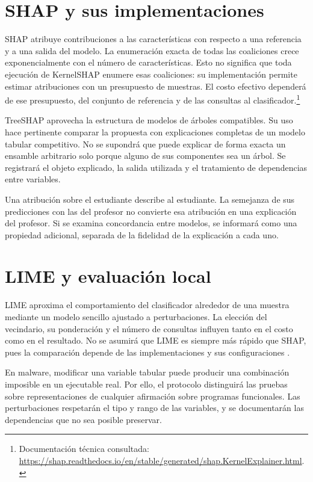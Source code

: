 \section{SHAP y sus implementaciones}
SHAP atribuye contribuciones a las características con respecto a una referencia y a una salida del modelo. La enumeración exacta de todas las coaliciones crece exponencialmente con el número de características. Esto no significa que toda ejecución de KernelSHAP enumere esas coaliciones: su implementación permite estimar atribuciones con un presupuesto de muestras. El costo efectivo dependerá de ese presupuesto, del conjunto de referencia y de las consultas al clasificador.\footnote{Documentación técnica consultada: \url{https://shap.readthedocs.io/en/stable/generated/shap.KernelExplainer.html}.}

TreeSHAP aprovecha la estructura de modelos de árboles compatibles. Su uso hace pertinente comparar la propuesta con explicaciones completas de un modelo tabular competitivo. No se supondrá que puede explicar de forma exacta un ensamble arbitrario solo porque alguno de sus componentes sea un árbol. Se registrará el objeto explicado, la salida utilizada y el tratamiento de dependencias entre variables.

Una atribución sobre el estudiante describe al estudiante. La semejanza de sus predicciones con las del profesor no convierte esa atribución en una explicación del profesor. Si se examina concordancia entre modelos, se informará como una propiedad adicional, separada de la fidelidad de la explicación a cada uno.

\section{LIME y evaluación local}
LIME aproxima el comportamiento del clasificador alrededor de una muestra mediante un modelo sencillo ajustado a perturbaciones. La elección del vecindario, su ponderación y el número de consultas influyen tanto en el costo como en el resultado. No se asumirá que LIME es siempre más rápido que SHAP, pues la comparación depende de las implementaciones y sus configuraciones \parencite{Liu2025GlassBox}.

En malware, modificar una variable tabular puede producir una combinación imposible en un ejecutable real. Por ello, el protocolo distinguirá las pruebas sobre representaciones de cualquier afirmación sobre programas funcionales. Las perturbaciones respetarán el tipo y rango de las variables, y se documentarán las dependencias que no sea posible preservar.

